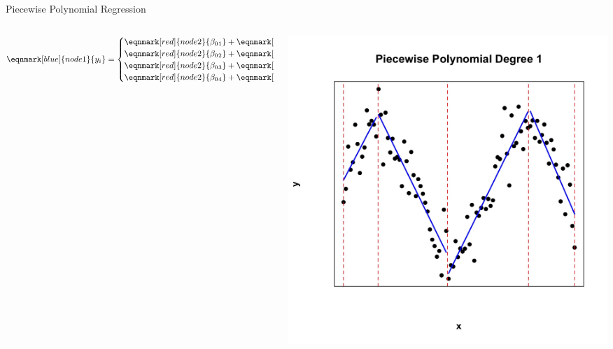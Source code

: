 \documentclass[english]{beamer}
\begin{document}
\begin{frame}{Piecewise Polynomial Regression}
     \centering
     \begin{columns}
         \begin{column}{0.55\textwidth}
     {\scriptsize
          \begin{equation*}
             \eqnmark[blue]{node1}{y_i}=
               \begin{cases} 
                  \eqnmark[red]{node2}{\beta_0{}_1} + 
                  \eqnmark[purple]{node3}{\beta_{11}x} + 
                  \eqnmark[orange]{node4}{\epsilon} & \text{if } 
                  \eqnmark{node5}{x < \xi_1,} \\
                  \eqnmark[red]{node2}{\beta_0{}_2} + 
                  \eqnmark[purple]{node3}{\beta_{12}x} + 
                  \eqnmark[orange]{node4}{\epsilon} & \text{if } 
                  \eqnmark{node5}{\xi_1 \geq x < \xi_2,} \\
                  \eqnmark[red]{node2}{\beta_0{}_3} + 
                  \eqnmark[purple]{node3}{\beta_{13}x} + 
                  \eqnmark[orange]{node4}{\epsilon} & \text{if } 
                  \eqnmark{node5}{\xi_2\geq x < \xi_3,} \\
                  \eqnmark[red]{node2}{\beta_0{}_4} + 
                  \eqnmark[purple]{node3}{\beta_{14}x} + 
                  \eqnmark[orange]{node4}{\epsilon} & \text{if } 
                  \eqnmark{node5}{\xi_3 \geq x < \xi_4.} 
              \end{cases}
          \end{equation*}
          }
          \end{column}
          \begin{column}{0.5\textwidth}
             \centering
            \includegraphics[width=\linewidth, height=0.6\textheight, keepaspectratio]{images/piecewise_degree_1.jpeg}  

\end{column}
\end{columns}
\end{frame}
\end{document}
